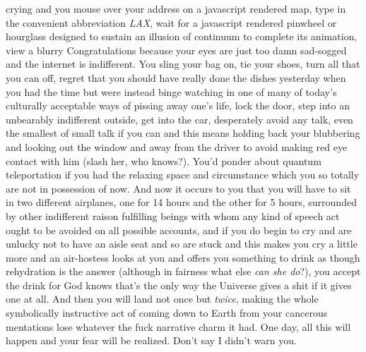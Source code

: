 \documentclass{article}
\begin{document}
crying and you mouse over your address on a javascript rendered map,
type in the convenient abbreviation \textit{LAX}, wait for a javascript
rendered pinwheel or hourglass designed to sustain an illusion of
continuum to complete its animation, view a blurry Congratulations
because your eyes are just too damn sad-sogged and the internet is
indifferent. You sling your bag on, tie your shoes, turn all that you
can off, regret that you should have really done the dishes yesterday
when you had the time but were instead binge watching in one of many of
today's culturally acceptable ways of pissing away one's life, lock the
door, step into an unbearably indifferent outside, get into the
car, desperately avoid any talk, even the smallest of small talk if you
can and this means holding back your blubbering and looking out the
window and away from the driver to avoid making red eye contact with him
(slash her, who knows?). You'd ponder about quantum teleportation if you
had the relaxing space and circumstance which you so totally are not in
possession of now. And now it occurs to you that you will have to sit in
two different airplanes, one for 14 hours and the other for 5 hours,
surrounded by other indifferent raison fulfilling beings with whom any
kind of speech act ought to be avoided on all possible accounts, and if
you do begin to cry and are unlucky not to have an aisle seat and so are
stuck and this makes you cry a little more and an air-hostess looks at
you and offers you something to drink as though rehydration is the
answer (although in fairness what else \textit{can she do}?), you accept
the drink for God knows that's the only way the Universe gives a shit if
it gives one at all. And then you will land not once but \textit{twice},
making the whole symbolically instructive act of coming down to
Earth from your cancerous mentations lose whatever the fuck narrative
charm it had. One day, all this will happen and your fear will be
realized. Don't say I didn't warn you.
\end{document}
